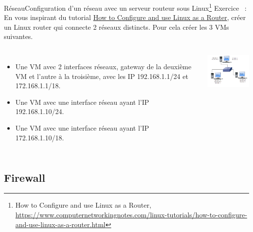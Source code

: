 \documentclass{beamer}
\begin{document}
    \begin{frame}{Réseau}{Configuration d'un réseau avec un serveur routeur sous Linux\footnote{How to Configure and use Linux as a Router, \url{https://www.computernetworkingnotes.com/linux-tutorials/how-to-configure-and-use-linux-as-a-router.html}}}
        Exercice \execcounterdispinc{}~:
        En vous inspirant du tutorial \href{How to Configure and use Linux as a Router}{How to Configure and use Linux as a Router}, créer un Linux router qui connecte 2 réseaux distincts.
        Pour cela créer les 3 VMs suivantes.
        \begin{columns}
            \begin{itemize}
                \item Une VM avec 2 interfaces réseaux, gateway de la deuxième VM et l'autre à la troisième, avec les IP 192.168.1.1/24 et 172.168.1.1/18.
                \item Une VM avec une interface réseau ayant l'IP 192.168.1.10/24.
                \item Une VM avec une interface réseau ayant l'IP 172.168.1.10/18.
            \end{itemize}
            \centering
            \includegraphics[width=5cm]{image/exercice-routing}
        \end{columns}
    \end{frame}

    \subsection{Firewall}\label{subsec:firewall}
\end{document}

